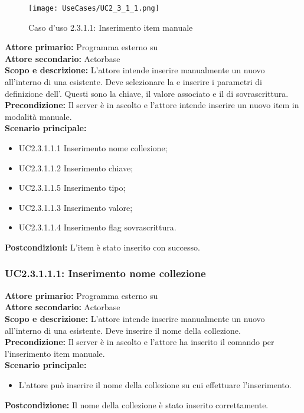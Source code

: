 \documentclass{scalatekids-article}
\begin{document}
\begin{figure}[H]
  \begin{center}
    \texttt{[image: UseCases/UC2\_3\_1\_1.png]}
    \caption{Caso d'uso 2.3.1.1: Inserimento item manuale}
  \end{center}
\end{figure}
\textbf{Attore primario:} Programma esterno su \\
\textbf{Attore secondario:} Actorbase\\
\textbf{Scopo e descrizione:} L'attore intende inserire manualmente un nuovo  all'interno di una  esistente. Deve selezionare la  e inserire i parametri di definizione dell'. Questi sono la chiave, il valore associato e il  di sovrascrittura.\\
\textbf{Precondizione:} Il server è in ascolto e l'attore intende inserire un nuovo item in modalità manuale.\\
\textbf{Scenario principale:}
\begin{itemize}
\item UC2.3.1.1.1 Inserimento nome collezione;
\item UC2.3.1.1.2 Inserimento chiave;
\item UC2.3.1.1.5 Inserimento tipo;
\item UC2.3.1.1.3 Inserimento valore;
\item UC2.3.1.1.4 Inserimento flag sovrascrittura.
\end{itemize}
\textbf{Postcondizioni:} L'item è stato inserito con successo.

\subsubsection{UC2.3.1.1.1: Inserimento nome collezione}

\textbf{Attore primario:} Programma esterno su \\
\textbf{Attore secondario:} Actorbase\\
\textbf{Scopo e descrizione:} L'attore intende inserire manualmente un nuovo  all'interno di una  esistente. Deve inserire il nome della collezione.\\
\textbf{Precondizione:} Il server è in ascolto e l'attore ha inserito il comando per l'inserimento item manuale.\\
\textbf{Scenario principale:}
\begin{itemize}
\item L'attore può inserire il nome della collezione su cui effettuare l'inserimento.
\end{itemize}
\textbf{Postcondizione:} Il nome della collezione è stato inserito correttamente.
\end{document}
